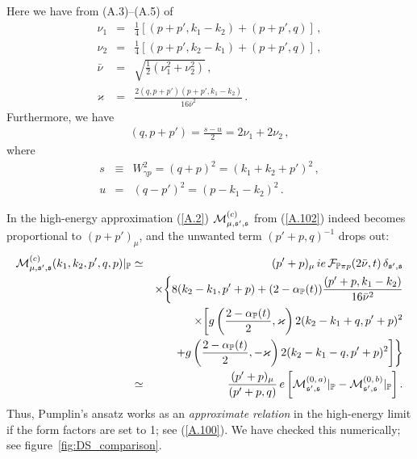 \documentclass[a4paper,11pt]{article}
\newcommand{\nn}{\nonumber}
\newcommand{\Pom}{\mathbb{P}}
\begin{document}
%
Here we have from (A.3)--(A.5) of \cite{Lebiedowicz:2025xob}
%
\begin{eqnarray}
\nu_{1} &=& \frac{1}{4}\left[ (p+p',k_{1}-k_{2}) + (p+p',q) \right]\,, \nn\\
\nu_{2} &=& \frac{1}{4}\left[ (p+p',k_{2}-k_{1}) + (p+p',q) \right]\,,\nn\\
\bar{\nu} &=& \sqrt{\frac{1}{2}(\nu_{1}^{2} + \nu_{2}^{2})}\,, \nn\\
\varkappa &=& \frac{2(q,p+p')(p+p',k_{1}-k_{2})}{16 \bar{\nu}^{2}}\,.
\label{A.5}
\end{eqnarray}
%
%
Furthermore, we have
%
\begin{eqnarray}
(q, p + p') = \frac{s-u}{2} = 2 \nu_{1} + 2 \nu_{2}\,,
\label{Pumplin_aux}
\end{eqnarray}
where
\begin{eqnarray}
s & \equiv & W_{\gamma p}^{2} = (q + p)^{2} = (k_{1} + k_{2} + p')^{2}\,, \nn\\
u &=& (q - p')^{2} = (p - k_{1} - k_{2})^{2}\,.
\end{eqnarray}

In the high-energy approximation (\ref{A.2})
${\cal M}_{\mu, \mathfrak{s'},\mathfrak{s}}^{(c)}$ from (\ref{A.102})
indeed becomes proportional to $(p + p')_{\mu}$,
and the unwanted term $(p' + p,q)^{-1}$ drops out:
%
\begin{eqnarray}
{\cal M}_{\mu, \mathfrak{s'},\mathfrak{s}}^{(c)}(k_{1},k_{2},p',q,p)|_{\Pom}
&\simeq & (p'+p)_{\mu}\, ie \,
{\cal F}_{\Pom \pi p}(2 \bar{\nu}, t) \, \delta_{\mathfrak{s'},\mathfrak{s}}
\nn \\
&& \times \bigg{\lbrace}  8 (k_{2} - k_{1}, p' + p)
+ (2 - \alpha_{\Pom}(t)) \frac{(p'+p,k_{1}-k_{2})}{16 \bar{\nu}^{2}}\nonumber\\
&& \times
\bigg{[}
g\left( \frac{2 - \alpha_{\Pom}(t)}{2}, \varkappa \right)
2(k_{2} - k_{1} + q,p'+p)^{2} \nonumber\\
&& + 
g\left( \frac{2 - \alpha_{\Pom}(t)}{2}, -\varkappa \right)
2(k_{2} - k_{1} - q,p'+p)^{2}
\bigg{]}
\bigg{\rbrace} \nn \\
&\simeq & \frac{(p'+p)_{\mu}}{(p'+p,q)} \,e \,
\bigg{[}
{\cal M}_{\mathfrak{s'},\mathfrak{s}}^{(0, \,a)}|_{\Pom}
-
{\cal M}_{\mathfrak{s'},\mathfrak{s}}^{(0, \,b)}|_{\Pom}
\bigg{]}
\,.
\label{A.6}
\end{eqnarray}
%
Thus, Pumplin's ansatz works as an \textit{approximate relation}
in the high-energy limit if the form factors
are set to 1; see (\ref{A.100}).
We have checked this numerically; see figure~\ref{fig:DS_comparison}.
\end{document}
